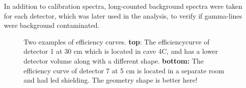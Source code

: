 \noindent
In addition to calibration spectra, long-counted background spectra were taken for each detector, which was later used in the analysis, to verify if gamma-lines were background contaminated. 


\begin{figure}%
    \centering
    
    \caption{Two examples of efficiency curves. \textbf{top}: The efficiencycurve of detector 1 at 30 cm which is located in cave 4C, and has a lower detector volume along with a different shape. \textbf{bottom:} The efficiency curve of detector 7 at 5 cm is located in a separate room and had led shielding. The geometry shape is better here!  }%
    \label{fig:efficiency_curves}%
\end{figure}




